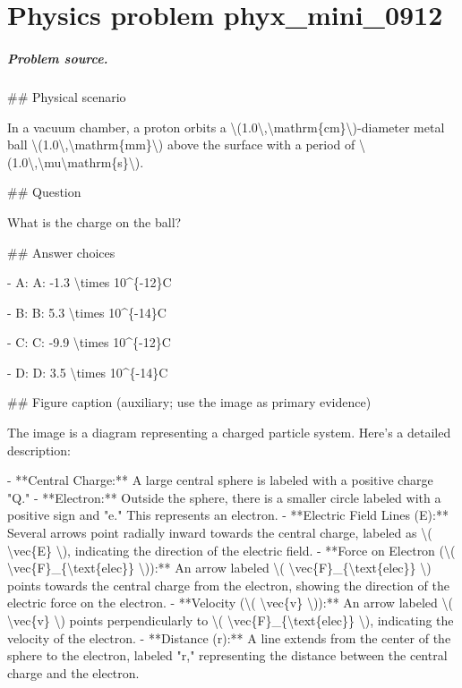 
\chapter{Physics problem phyx\_mini\_0912}
\label{ch:PhyXMiniProblems_problem_phyx_mini_0912}

\paragraph{Problem source.}
\#\# Physical scenario

In a vacuum chamber, a proton orbits a \textbackslash{}(1.0\textbackslash{},\textbackslash{}mathrm\{cm\}\textbackslash{})-diameter metal ball \textbackslash{}(1.0\textbackslash{},\textbackslash{}mathrm\{mm\}\textbackslash{}) above the surface with a period of \textbackslash{}(1.0\textbackslash{},\textbackslash{}mu\textbackslash{}mathrm\{s\}\textbackslash{}).

\#\# Question

What is the charge on the ball?

\#\# Answer choices

- A: A: -1.3 \textbackslash{}times 10\textasciicircum{}\{-12\}C

- B: B: 5.3 \textbackslash{}times 10\textasciicircum{}\{-14\}C

- C: C: -9.9 \textbackslash{}times 10\textasciicircum{}\{-12\}C

- D: D: 3.5 \textbackslash{}times 10\textasciicircum{}\{-14\}C

\#\# Figure caption (auxiliary; use the image as primary evidence)

The image is a diagram representing a charged particle system. Here's a detailed description:

- **Central Charge:** A large central sphere is labeled with a positive charge "Q."
- **Electron:** Outside the sphere, there is a smaller circle labeled with a positive sign and "e." This represents an electron.
- **Electric Field Lines (E):** Several arrows point radially inward towards the central charge, labeled as \textbackslash{}( \textbackslash{}vec\{E\} \textbackslash{}), indicating the direction of the electric field.
- **Force on Electron (\textbackslash{}( \textbackslash{}vec\{F\}\_\{\textbackslash{}text\{elec\}\} \textbackslash{})):** An arrow labeled \textbackslash{}( \textbackslash{}vec\{F\}\_\{\textbackslash{}text\{elec\}\} \textbackslash{}) points towards the central charge from the electron, showing the direction of the electric force on the electron.
- **Velocity (\textbackslash{}( \textbackslash{}vec\{v\} \textbackslash{})):** An arrow labeled \textbackslash{}( \textbackslash{}vec\{v\} \textbackslash{}) points perpendicularly to \textbackslash{}( \textbackslash{}vec\{F\}\_\{\textbackslash{}text\{elec\}\} \textbackslash{}), indicating the velocity of the electron.
- **Distance (r):** A line extends from the center of the sphere to the electron, labeled "r," representing the distance between the central charge and the electron. 

